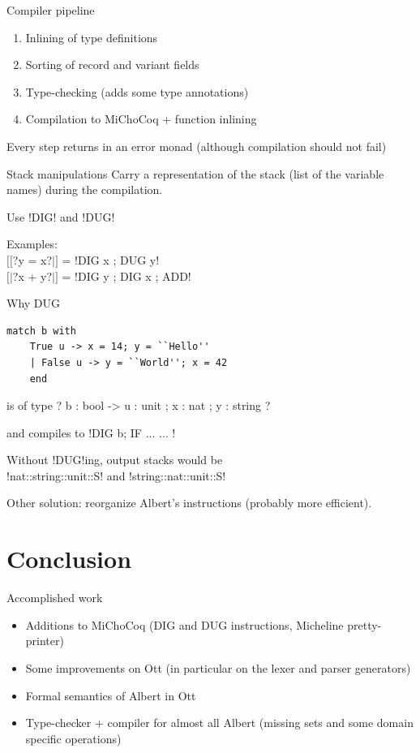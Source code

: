 \documentclass[aspectratio=169]{beamer}
\begin{document}
\begin{frame}{Compiler pipeline}
  \begin{enumerate}
  \item Inlining of type definitions
  \item Sorting of record and variant fields
  \item Type-checking (adds some type annotations)
  \item Compilation to MiChoCoq + function inlining
  \end{enumerate}
  Every step returns in an error monad (although compilation should not fail)
\end{frame}

\begin{frame}[fragile]{Stack manipulations}
  Carry a representation of the stack (list of the variable names) during the compilation.

  Use !DIG! and !DUG!

  Examples:\\
  $[[$?y = x?$|]$ = !DIG x ; DUG y!\\
  $[|$?x + y?$|]$ = !DIG y ; DIG x ; ADD!\\
\end{frame} 

\begin{frame}[fragile]{Why DUG}
  \begin{lstlisting}[language=albert]
    match b with
    True u -> x = 14; y = ``Hello''
    | False u -> y = ``World''; x = 42
    end
  \end{lstlisting}
  is of type ?{ b : bool } -> { u : unit ; x : nat ; y : string }?

  and compiles to !DIG b; IF { ... } { ... }!

  Without !DUG!ing, output stacks would be\\
  !nat::string::unit::S! and !string::nat::unit::S!

  Other solution: reorganize Albert's instructions (probably more efficient).
\end{frame}

\section{Conclusion}

\begin{frame}{Accomplished work}
  \begin{itemize}
  \item Additions to MiChoCoq (DIG and DUG instructions, Micheline pretty-printer)
  \item Some improvements on Ott (in particular on the lexer and parser generators)
  \item Formal semantics of Albert in Ott
  \item Type-checker + compiler for almost all Albert (missing sets and some domain specific operations)
  \end{itemize}
\end{frame}
\end{document}
